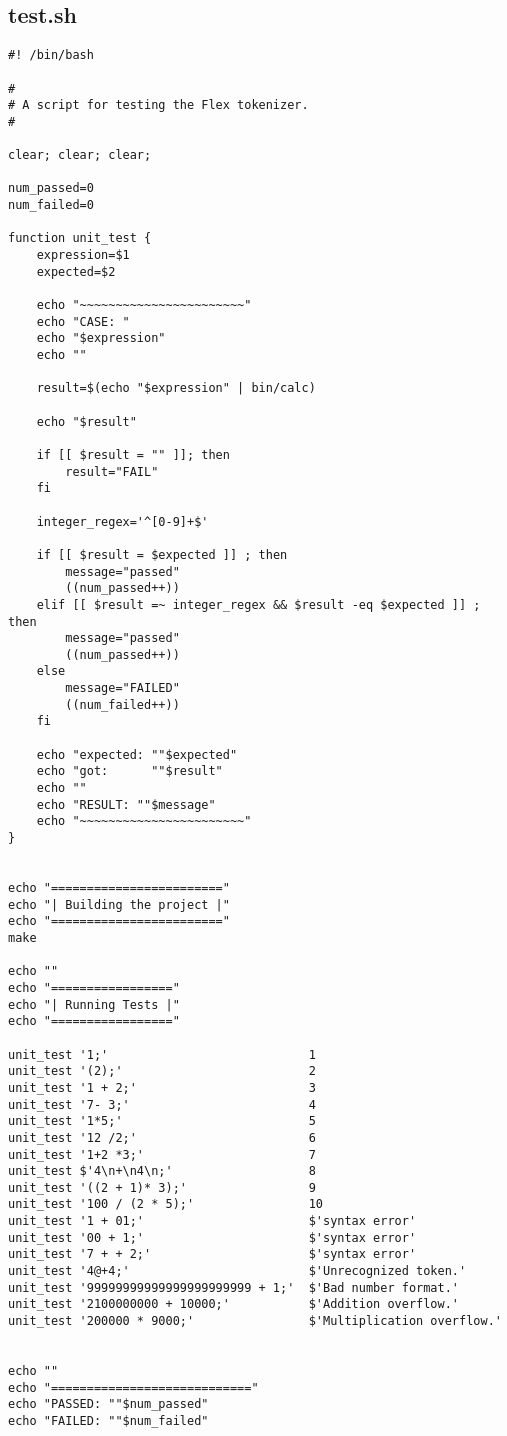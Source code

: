 \documentclass{article}
\begin{document}
\subsection{test.sh}
\begin{verbatim}
#! /bin/bash

#
# A script for testing the Flex tokenizer.
#

clear; clear; clear;

num_passed=0
num_failed=0

function unit_test {
	expression=$1
	expected=$2

	echo "~~~~~~~~~~~~~~~~~~~~~~~"
	echo "CASE: "
	echo "$expression"
	echo ""

	result=$(echo "$expression" | bin/calc)

	echo "$result"

	if [[ $result = "" ]]; then
		result="FAIL"
	fi

	integer_regex='^[0-9]+$'

	if [[ $result = $expected ]] ; then
		message="passed"
		((num_passed++))
	elif [[ $result =~ integer_regex && $result -eq $expected ]] ; then
		message="passed"
		((num_passed++))
	else
		message="FAILED"
		((num_failed++))
	fi

	echo "expected: ""$expected"
	echo "got:      ""$result"
	echo ""
	echo "RESULT: ""$message"
	echo "~~~~~~~~~~~~~~~~~~~~~~~"
}


echo "========================"
echo "| Building the project |"
echo "========================"
make

echo ""
echo "================="
echo "| Running Tests |"
echo "================="

unit_test '1;'                            1
unit_test '(2);'                          2
unit_test '1 + 2;'                        3
unit_test '7- 3;'                         4
unit_test '1*5;'                          5
unit_test '12 /2;'                        6
unit_test '1+2 *3;'                       7
unit_test $'4\n+\n4\n;'                   8 
unit_test '((2 + 1)* 3);'                 9
unit_test '100 / (2 * 5);'                10
unit_test '1 + 01;'                       $'syntax error'
unit_test '00 + 1;'                       $'syntax error'
unit_test '7 + + 2;'                      $'syntax error'
unit_test '4@+4;'                         $'Unrecognized token.'
unit_test '99999999999999999999999 + 1;'  $'Bad number format.'
unit_test '2100000000 + 10000;'           $'Addition overflow.'
unit_test '200000 * 9000;'                $'Multiplication overflow.'


echo ""
echo "============================"
echo "PASSED: ""$num_passed"
echo "FAILED: ""$num_failed"
\end{verbatim}
\end{document}
